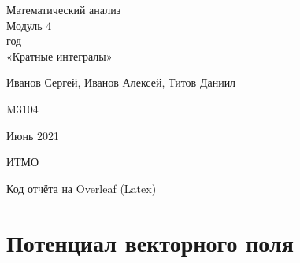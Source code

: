 \documentclass{article}
\begin{document}
    \begin{center}
        \hfill \break

        \LARGE{Математический анализ}\\
        \hfill \break
        \normalsize{Модуль 4\\
        \hfill {} год\\
        \hfill \break
        «Кратные интегралы»}\\
        \hfill \break
        \hfill \break
        \hfill \break
        \hfill \break
    \end{center}

    \begin{flushright} Иванов Сергей, Иванов Алексей, Титов Даниил \end{flushright}
    \begin{flushright} M3104 \end{flushright}
    \vfill
    \bigskip
    \begin{center} Июнь 2021 \end{center}
    \begin{center} ИТМО \end{center}
    \thispagestyle{empty} %
    \newpage
    \tableofcontents{}
    \vfill
    \bigskip
    \begin{flushright} \href{https://ru.overleaf.com/read/vdjmnbrygsdc}{Код отчёта на Overleaf (Latex)} \end{flushright}
    \newpage
    \section{Потенциал векторного поля}
\end{document}
